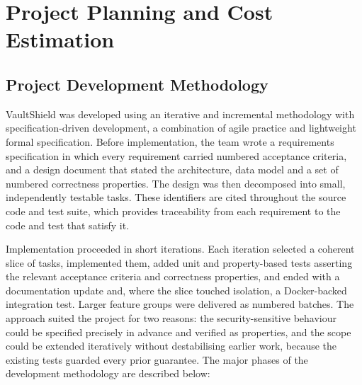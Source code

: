 \documentclass[12pt,a4paper,oneside]{report}
\begin{document}
\clearpage

\chapter{Project Planning and Cost Estimation}\label{project-planning}

\section{Project Development Methodology}\label{project-development-methodology}

VaultShield was developed using an iterative and incremental methodology with specification-driven development, a combination of agile practice and lightweight formal specification. Before implementation, the team wrote a requirements specification in which every requirement carried numbered acceptance criteria, and a design document that stated the architecture, data model and a set of numbered correctness properties. The design was then decomposed into small, independently testable tasks. These identifiers are cited throughout the source code and test suite, which provides traceability from each requirement to the code and test that satisfy it.

Implementation proceeded in short iterations. Each iteration selected a coherent slice of tasks, implemented them, added unit and property-based tests asserting the relevant acceptance criteria and correctness properties, and ended with a documentation update and, where the slice touched isolation, a Docker-backed integration test. Larger feature groups were delivered as numbered batches. The approach suited the project for two reasons: the security-sensitive behaviour could be specified precisely in advance and verified as properties, and the scope could be extended iteratively without destabilising earlier work, because the existing tests guarded every prior guarantee. The major phases of the development methodology are described below:
\end{document}

